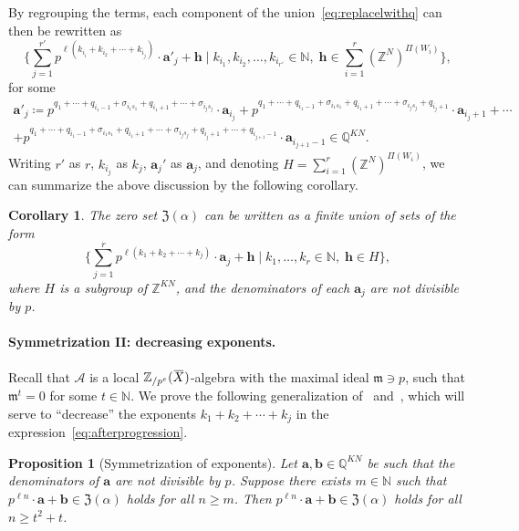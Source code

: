 \documentclass[letterpaper, 11pt, thm-restate]{article}
\numberwithin{equation}{section}
\newcommand{\Z}{\mathbb{Z}}
\newcommand{\N}{\mathbb{N}}
\newcommand{\Q}{\mathbb{Q}}
\newcommand{\Zpe}{\mathbb{Z}_{/p^e}}
\newcommand{\mA}{\mathcal{A}}
\newcommand{\mZ}{\mathfrak{Z}}
\newcommand{\ba}{\boldsymbol{a}}
\newcommand{\bb}{\boldsymbol{b}}
\newcommand{\bh}{\boldsymbol{h}}
\newcommand{\oX}{\mkern 1.5mu\overline{\mkern-1.5mu X \mkern-1.5mu}\mkern 1.5mu}
\newcommand{\frm}{\mathfrak{m}}
\newtheorem{prop}[thrm]{Proposition}
\newtheorem{cor}[thrm]{Corollary}
\theoremstyle{definition}
\theoremstyle{definition}
\theoremstyle{definition}
\begin{document}
By regrouping the terms, each component of the union~\eqref{eq:replacelwithq} can then be rewritten as
\begin{equation}\label{eq:protoform}
\Bigg\{\sum_{j = 1}^{r'} p^{\ell(k_{i_i} + k_{i_2} + \cdots + k_{i_j})} \cdot \ba'_j + \bh \;\Bigg|\; k_{i_1}, k_{i_2}, \ldots, k_{i_{r'}} \in \N,\; \bh \in \sum_{i = 1}^r (\Z^N)^{\Pi(W_i)} \Bigg\},
\end{equation}
for some 
\begin{multline*}
\ba'_j \coloneqq p^{q_1 + \cdots + q_{i_1 - 1} + \sigma_{i_1s_1} + q_{i_1 + 1} + \cdots + \sigma_{i_js_j}} \cdot \ba_{i_j} + p^{q_1 + \cdots + q_{i_1 - 1} + \sigma_{i_1s_1} + q_{i_1 + 1} + \cdots + \sigma_{i_js_j} + q_{i_j + 1}} \cdot \ba_{i_j + 1} + \cdots \\
+ p^{q_1 + \cdots + q_{i_1 - 1} + \sigma_{i_1s_1} + q_{i_1 + 1} + \cdots + \sigma_{i_js_j} + q_{i_j + 1} + \cdots + q_{i_{j+1} - 1}} \cdot \ba_{i_{j+1} - 1} \in \Q^{KN}.
\end{multline*}
Writing $r'$ as $r$, $k_{i_j}$ as $k_j$, $\ba_j'$ as $\ba_j$, and denoting $H = \sum_{i = 1}^r (\Z^N)^{\Pi(W_i)}$, we can summarize the above discussion by the following corollary.

\begin{cor}\label{cor:afterprogression}
    The zero set $\mZ(\alpha)$ can be written as a finite union of sets of the form
    \begin{equation}\label{eq:afterprogression}
        \Bigg\{\sum_{j = 1}^{r} p^{\ell(k_1 + k_2 + \cdots + k_j)} \cdot \ba_j + \bh \;\Bigg|\; k_1, \ldots, k_r \in \N,\; \bh \in H \Bigg\},
    \end{equation}
    where $H$ is a subgroup of $\Z^{KN}$, and the denominators of each $\ba_j$ are not divisible by $p$.
\end{cor}

\paragraph{Symmetrization II: decreasing exponents.}
Recall that $\mA$ is a local $\Zpe(\oX)$-algebra with the maximal ideal $\frm \ni p$, such that $\frm^t = 0$ for some $t \in \N$.
We prove the following generalization of~\cite[Lemma~8.1]{derksen2007skolem} and~\cite[Lemma~12.1]{derksen2012linear}, which will serve to ``decrease'' the exponents $k_1 + k_2 + \cdots + k_j$ in the expression~\eqref{eq:afterprogression}.

\begin{prop}[Symmetrization of exponents]\label{prop:symmetrize}
    Let $\ba, \bb \in \Q^{KN}$ be such that the denominators of $\ba$ are not divisible by $p$.
    Suppose there exists $m \in \N$ such that $p^{\ell n} \cdot \ba + \bb \in \mZ(\alpha)$ holds for all $n \geq m$. Then $p^{\ell n} \cdot \ba + \bb \in \mZ(\alpha)$ holds for all $n \geq t^2 + t$.
\end{prop}
\end{document}
